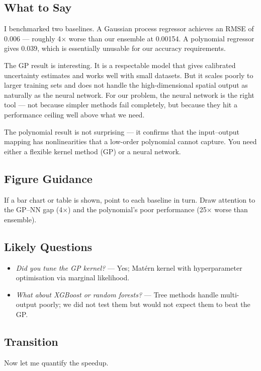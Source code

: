 \documentclass[12pt,a4paper]{article}
\begin{document}
\subsection*{What to Say}

I benchmarked two baselines. A Gaussian process regressor achieves an
RMSE of 0.006 --- roughly 4$\times$ worse than our ensemble at
0.00154. A polynomial regressor gives 0.039, which is essentially
unusable for our accuracy requirements.

The GP result is interesting. It is a respectable model that gives
calibrated uncertainty estimates and works well with small datasets.
But it scales poorly to larger training sets and does not handle the
high-dimensional spatial output as naturally as the neural network.
For our problem, the neural network is the right tool --- not because
simpler methods fail completely, but because they hit a performance
ceiling well above what we need.

The polynomial result is not surprising --- it confirms that the
input--output mapping has nonlinearities that a low-order polynomial
cannot capture. You need either a flexible kernel method (GP) or a
neural network.

\subsection*{Figure Guidance}
If a bar chart or table is shown, point to each baseline in turn.
Draw attention to the GP--NN gap (4$\times$) and the polynomial's
poor performance (25$\times$ worse than ensemble).

\subsection*{Likely Questions}
\begin{itemize}
  \item \emph{Did you tune the GP kernel?}
    --- Yes; Mat\'ern kernel with hyperparameter optimisation via
    marginal likelihood.
  \item \emph{What about XGBoost or random forests?}
    --- Tree methods handle multi-output poorly; we did not test
    them but would not expect them to beat the GP.
\end{itemize}

\subsection*{Transition}
Now let me quantify the speedup.
\end{document}
